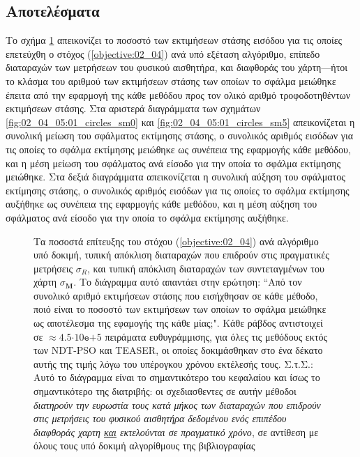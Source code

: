 \subsection{Αποτελέσματα}
\label{subsection:02_04_05:02}

Το σχήμα \ref{fig:02_04_05:01} απεικονίζει το ποσοστό των εκτιμήσεων στάσης
εισόδου για τις οποίες επετεύχθη ο στόχος (\ref{objective:02_04}) ανά υπό
εξέταση αλγόριθμο, επίπεδο διαταραχών των μετρήσεων του φυσικού αισθητήρα, και
διαφθοράς του χάρτη---ήτοι το κλάσμα του αριθμού των εκτιμήσεων στάσης των
οποίων το σφάλμα μειώθηκε έπειτα από την εφαρμογή της κάθε μεθόδου προς τον
ολικό αριθμό τροφοδοτηθέντων εκτιμήσεων στάσης. Στα αριστερά διαγράμματα των
σχημάτων \ref{fig:02_04_05:01_circles_sm0} και
\ref{fig:02_04_05:01_circles_sm5} απεικονίζεται η συνολική μείωση του σφάλματος
εκτίμησης στάσης, ο συνολικός αριθμός εισόδων για τις οποίες το σφάλμα
εκτίμησης μειώθηκε ως συνέπεια της εφαρμογής κάθε μεθόδου, και η μέση μείωση
του σφάλματος ανά είσοδο για την οποία το σφάλμα εκτίμησης μειώθηκε. Στα δεξιά
διαγράμματα απεικονίζεται η συνολική αύξηση του σφάλματος εκτίμησης στάσης, ο
συνολικός αριθμός εισόδων για τις οποίες το σφάλμα εκτίμησης αυξήθηκε ως
συνέπεια της εφαρμογής κάθε μεθόδου, και η μέση αύξηση του σφάλματος ανά είσοδο
για την οποία το σφάλμα εκτίμησης αυξήθηκε.


\begin{figure}[!h]\vspace{1.5cm}\hspace{0.6cm}%
  
  \vspace{0.75cm}
  \caption{\small Τα ποσοστά επίτευξης του στόχου (\ref{objective:02_04}) ανά
           αλγόριθμο υπό δοκιμή, τυπική απόκλιση διαταραχών που επιδρούν στις
           πραγματικές μετρήσεις $\sigma_R$, και τυπική απόκλιση διαταραχών των
           συντεταγμένων του χάρτη $\sigma_{\bm{M}}$. Το διάγραμμα αυτό
           απαντάει στην ερώτηση: ``Από τον συνολικό αριθμό εκτιμήσεων στάσης
           που εισήχθησαν σε κάθε μέθοδο, ποιό είναι το ποσοστό των εκτιμήσεων
           των οποίων το σφάλμα μειώθηκε ως αποτέλεσμα της εφαμογής της κάθε
           μίας;". Κάθε ράβδος αντιστοιχεί σε $\approx
           4.5$$\cdot$$10\texttt{e}$$+$$5$ πειράματα ευθυγράμμισης, για όλες
           τις μεθόδους εκτός των NDT-PSO και TEASER, οι οποίες δοκιμάσθηκαν
           στο ένα δέκατο αυτής της τιμής λόγω του υπέρογκου χρόνου εκτέλεσής
           τους.  Σ.τ.Σ.: Αυτό το διάγραμμα είναι το σημαντικότερο του
           κεφαλαίου και ίσως το σημαντικότερο της διατριβής: οι σχεδιασθεντες
           σε αυτήν μέθοδοι \textit{διατηρούν την ευρωστία τους κατά μήκος των
           διαταραχών που επιδρούν στις μετρήσεις του φυσικού αισθητήρα
           δεδομένου ενός επιπέδου διαφθοράς χαρτη \underline{και} εκτελούνται
           σε πραγματικό χρόνο}, σε αντίθεση με όλους τους υπό δοκιμή
           αλγορίθμους της βιβλιογραφίας}
  \label{fig:02_04_05:01}
\end{figure}

